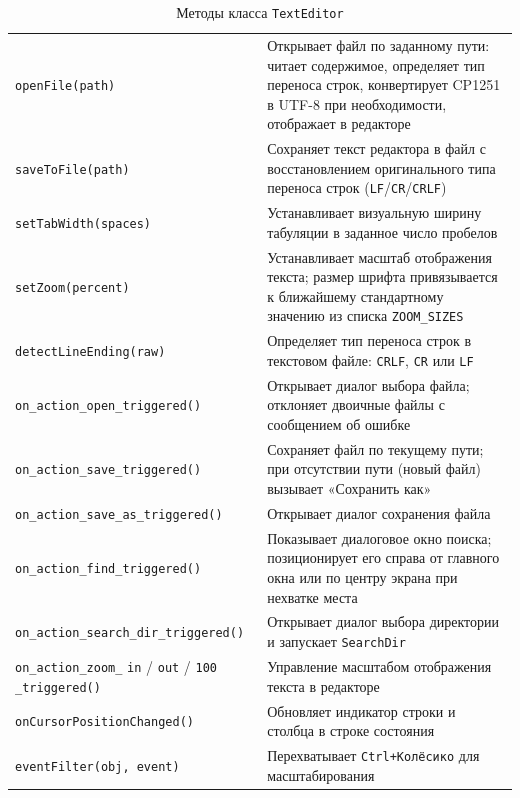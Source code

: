 \begin{xltabular}{\textwidth}{|C{6cm}|T|}
	\caption{Методы класса \texttt{TextEditor}}
	\label{tab:rp_texteditor_methods} \\
	\hline
	 &  \\
	\hline
	\finishhead
	\verb`openFile(path)` & Открывает файл по заданному пути: читает содержимое, определяет тип переноса строк, конвертирует CP1251 в UTF-8 при необходимости, отображает в редакторе \\
	\hline
	\verb`saveToFile(path)` & Сохраняет текст редактора в файл с восстановлением оригинального типа переноса строк (\verb`LF`/\verb`CR`/\verb`CRLF`) \\
	\hline
	\verb`setTabWidth(spaces)` & Устанавливает визуальную ширину табуляции в заданное число пробелов \\
	\hline
	\verb`setZoom(percent)` & Устанавливает масштаб отображения текста; размер шрифта привязывается к ближайшему стандартному значению из списка \verb`ZOOM_SIZES` \\
	\hline
	\verb`detectLineEnding(raw)` & Определяет тип переноса строк в текстовом файле: \verb`CRLF`, \verb`CR` или \verb`LF` \\
	\hline
	\verb`on_action_open_triggered()` & Открывает диалог выбора файла; отклоняет двоичные файлы с сообщением об ошибке \\
	\hline
	\verb`on_action_save_triggered()` & Сохраняет файл по текущему пути; при отсутствии пути (новый файл) вызывает «Сохранить как» \\
	\hline
	\verb`on_action_save_as_triggered()` & Открывает диалог сохранения файла \\
	\hline
	\verb`on_action_find_triggered()` & Показывает диалоговое окно поиска; позиционирует его справа от главного окна или по центру экрана при нехватке места \\
	\hline
	\verb`on_action_search_dir_triggered()` & Открывает диалог выбора директории и запускает \verb`SearchDir` \\
	\hline
	\verb`on_action_zoom_` \verb`in` / \verb`out` / \verb`100` \verb`_triggered()` & Управление масштабом отображения текста в редакторе \\
	\hline
	\verb`onCursorPositionChanged()` & Обновляет индикатор строки и столбца в строке состояния \\
	\hline
	\verb`eventFilter(obj, event)` & Перехватывает \verb`Ctrl+Колёсико` для масштабирования \\
\end{xltabular}

